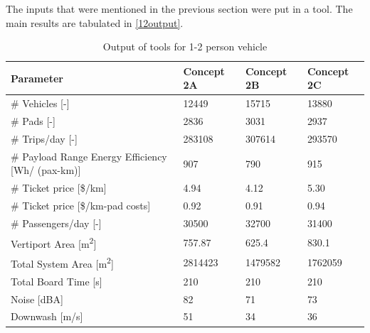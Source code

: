 The inputs that were mentioned in the previous section were put in a tool. The main results are tabulated in \autoref{12output}.

\begin{table}[H]
\captionsetup{justification=centering}
\caption{Output of tools for 1-2 person vehicle}
\label{12output}
\begin{tabular}{@{}llll@{}}
\toprule
\textbf{Parameter}                           & \textbf{Concept 2A} & \textbf{Concept 2B} & \textbf{Concept 2C} \\ \midrule
\# Vehicles {[}-{]}                          &          12449          &        15715        &           13880         \\
\# Pads {[}-{]}                               &       2836           &            3031      & 2937  \\
\# Trips/day {[}-{]}                         &          283108          &     307614          &           293570         \\
\# Payload Range Energy Efficiency {[}Wh/ (pax-km){]}           &          907          &       790     &        915      \\
\# Ticket price {[}\$/km{]}                  & 4.94                   & 4.12                   & 5.30                    \\
\# Ticket price {[}\$/km-pad costs{]}        & 0.92                    & 0.91                   & 0.94                   \\
\# Passengers/day {[}-{]}                    &          30500          &     32700        &           31400        \\
Vertiport Area {[}m\textsuperscript{2}{]}    &          757.87          &      625.4        &           830.1      \\
Total System Area {[}m\textsuperscript{2}{]} &          2814423          &     1479582  &         1762059         \\
Total Board Time {[}s{]}                     &          210          &     210               &               210     \\
Noise {[}dBA{]}                              &             82       &     71          &           73        \\
Downwash {[}m/s{]}                              &             51       &     34          &           36        \\ \bottomrule
\end{tabular}
\end{table}

